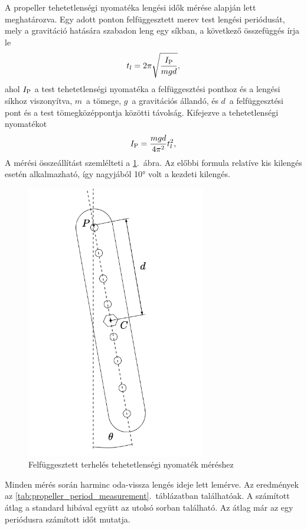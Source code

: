 A propeller tehetetlenségi nyomatéka lengési idők mérése alapján lett meghatározva. Egy 
adott ponton felfüggesztett merev test lengési periódusát, mely a gravitáció hatására 
szabadon leng egy síkban, a következő összefüggés írja le
\begin{equation}
    t_l = 2\pi\sqrt{\frac{I_{\mathrm{P}}}{mgd}},
\end{equation}
ahol \(I_{\mathrm{P}}\) a test tehetetlenségi nyomatéka a felfüggesztési ponthoz és a lengési síkhoz viszonyítva, 
\(m\)~a tömege, \(g\)~a gravitációs állandó, 
és \(d\)~a felfüggesztési pont és a test tömegközéppontja közötti távolság. 
Kifejezve a tehetetlenségi nyomatékot 
\begin{equation}
    I_{\mathrm{P}} = \frac{mgd}{4\pi^2}t^2_l,
\end{equation}
A mérési összeállítást szemlélteti a \ref{fig:propeller_pendulum}.~ábra. Az 
előbbi formula relatíve kis kilengés esetén alkalmazható, így nagyjából 
10° volt a kezdeti kilengés.

\begin{figure}[t!]
    \begin{center}
    \includegraphics[height=12cm]{images/impedance_control_propeller.png}
    \caption{Felfüggesztett terhelés tehetetlenségi nyomaték méréshez}\label{fig:propeller_pendulum}
    \end{center}
\end{figure}

Minden mérés során harminc oda-vissza 
lengés ideje lett lemérve. Az eredmények az \ref{tab:propeller_period_measurement}.~táblázatban találhatóak. A számított 
átlag a standard hibával együtt az utolsó sorban található. Az átlag már az egy periódusra számított 
időt mutatja.

